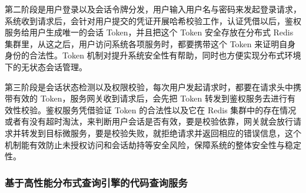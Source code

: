 \documentclass[UTF8,a4paper,12pt]{ctexart}
\numberwithin{equation}{section}
\begin{document}
第二阶段是用户登录以及会话令牌分发，用户输入用户名与密码来发起登录请求，系统收到请求后，会针对用户提交的凭证开展哈希校验工作，认证凭借以后，鉴权服务给用户生成唯一的会话 Token，并且把这个 Token 安全存放在分布式 Redis 集群里，从这之后，用户访问系统各项服务时，都要携带这个 Token 来证明自身身份的合法性。Token 机制对提升系统安全性有帮助，同时也方便实现分布式环境下的无状态会话管理。\par
第三阶段是会话状态检测以及权限校验，每次用户发起请求时，都要在请求头中携带有效的 Token，服务网关收到请求后，会先把 Token 转发到鉴权服务去进行有效性校验。鉴权服务凭借验证 Token 的合法性以及它在 Redis 集群中的存在情况或者有没有超时淘汰，来判断用户会话是否有效，要是校验依靠，网关就会放行请求并转发到目标微服务，要是校验失败，就拒绝请求并返回相应的错误信息，这个机制能有效防止未授权访问和会话劫持等安全风险，保障系统的整体安全性与稳定性。\par
\subsubsection{基于高性能分布式查询引擎的代码查询服务}
\end{document}
